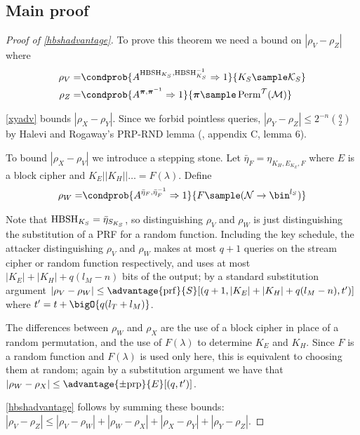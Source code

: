 \documentclass[eprint.tex]{subfiles}
\begin{document}
\subsection{Main proof}
\begin{proof}[Proof of \autoref{hbshadvantage}]
    To prove this theorem we need a bound on $|\rho_V - \rho_Z|$
    where
    \begin{align*}
        \rho_V =& \condprob{A^{\HBSH_{K_S}, \HBSH_{K_S}^{-1}}\Rightarrow 1}{K_S \sample \mathcal{K}_S} \\
        \rho_Z =& \condprob{A^{\bm{\pi},\bm{\pi}^{-1}}\Rightarrow 1}{\bm{\pi} \sample \Perm^\mathcal{T}(\mathcal{M})} \\
    \end{align*}

    \autoref{xyadv} bounds $|\rho_X - \rho_Y|$.
    Since we forbid pointless queries,
    $|\rho_Y - \rho_Z| \leq 2^{-n}\binom{q}{2}$ by Halevi and Rogaway's PRP-RND lemma
    (\cite{cmc}, appendix C, lemma 6).

    To bound $|\rho_X - \rho_V|$ we introduce
    a stepping stone. Let $\bar{\eta}_{F} = \eta_{K_H, E_{K_E}, F}$ where
    $E$ is a block cipher and $K_E || K_H || \ldots = F(\lambda)$. Define
    \begin{align*}
        \rho_W =& \condprob{A^{\bar{\eta}_{F}, \bar{\eta}_{F}^{-1}}\Rightarrow 1}{F \sample (\mathcal{N} \rightarrow \bin^{l_S})} \\
    \end{align*}

    Note that $\operatorname{HBSH}_{K_S} = \bar{\eta}_{S_{K_S}}$, so distinguishing
    $\rho_V$ and $\rho_W$ is just distinguishing the substitution of a PRF
    for a random function.
    Including the key schedule, the attacker distinguishing
    $\rho_V$ and $\rho_W$ makes at most $q + 1$ queries on the stream cipher
    or random function respectively, and uses at most $|K_E| + |K_H| + q(l_M - n)$ bits
    of the output; by a standard substitution argument
    $|\rho_V - \rho_W| \leq \advantage{\mathrm{prf}}{S}[(q + 1, |K_E| + |K_H| + q(l_M - n), t')]$ where $t' = t + \bigO{q(l_T + l_M)}$.

    The differences between $\rho_W$ and $\rho_X$ are the use of a block cipher
    in place of a random permutation, and the use of $F(\lambda)$ to determine
    $K_E$ and $K_H$. Since $F$ is a random function and $F(\lambda)$ is used
    only here, this is equivalent to choosing them at random; again by a substitution
    argument we have that $|\rho_W - \rho_X| \leq \advantage{\pm \mathrm{prp}}{E}[(q, t')]$.

    \autoref{hbshadvantage} follows by summing these bounds:
    $|\rho_V - \rho_Z| \leq |\rho_V - \rho_W| + |\rho_W - \rho_X| + |\rho_X - \rho_Y| + |\rho_Y - \rho_Z|$.
\end{proof}

\subbib
\end{document}
